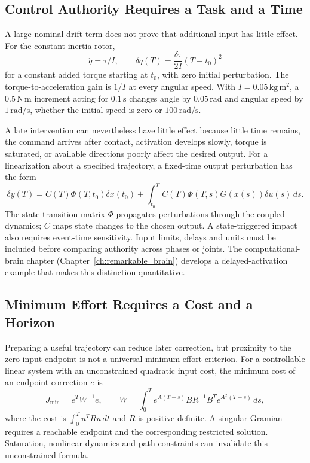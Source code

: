 \subsection{Control Authority Requires a Task and a Time}

A large nominal drift term does not prove that additional input has little effect. For the constant-inertia rotor,
\[
\ddot q=\tau/I,\qquad
\delta q(T)=\frac{\delta\tau}{2I}(T-t_0)^2
\]
for a constant added torque starting at $t_0$, with zero initial perturbation. The torque-to-acceleration gain is $1/I$ at every angular speed. With $I=0.05\,\mathrm{kg\,m^2}$, a $0.5\,\mathrm{N\,m}$ increment acting for $0.1\,\mathrm{s}$ changes angle by $0.05\,\mathrm{rad}$ and angular speed by $1\,\mathrm{rad/s}$, whether the initial speed is zero or $100\,\mathrm{rad/s}$.

A late intervention can nevertheless have little effect because little time remains, the command arrives after contact, activation develops slowly, torque is saturated, or available directions poorly affect the desired output. For a linearization about a specified trajectory, a fixed-time output perturbation has the form
\[
\delta y(T)=C(T)\Phi(T,t_0)\delta x(t_0)
 +\int_{t_0}^{T}C(T)\Phi(T,s)G(x(s))\delta u(s)\,ds.
\]
The state-transition matrix $\Phi$ propagates perturbations through the coupled dynamics; $C$ maps state changes to the chosen output. A state-triggered impact also requires event-time sensitivity. Input limits, delays and units must be included before comparing authority across phases or joints. The computational-brain chapter (Chapter~\ref{ch:remarkable_brain}) develops a delayed-activation example that makes this distinction quantitative.

\subsection{Minimum Effort Requires a Cost and a Horizon}

Preparing a useful trajectory can reduce later correction, but proximity to the zero-input endpoint is not a universal minimum-effort criterion. For a controllable linear system with an unconstrained quadratic input cost, the minimum cost of an endpoint correction $e$ is
\[
J_{\min}=e^T W^{-1}e,
\qquad
W=\int_0^T e^{A(T-s)}BR^{-1}B^T e^{A^T(T-s)}\,ds,
\]
where the cost is $\int_0^T u^TRu\,dt$ and $R$ is positive definite. A singular Gramian requires a reachable endpoint and the corresponding restricted solution. Saturation, nonlinear dynamics and path constraints can invalidate this unconstrained formula.

